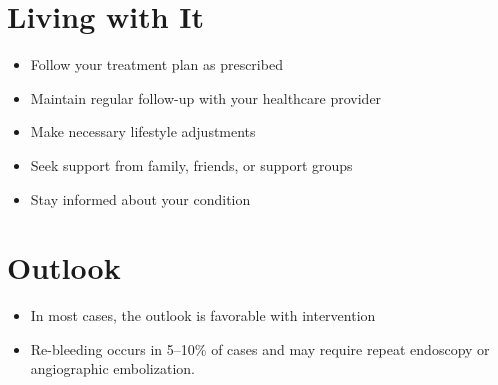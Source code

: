 \section{Living with It}
\begin{itemize}[noitemsep]
  \item Follow your treatment plan as prescribed
  \item Maintain regular follow-up with your healthcare provider
  \item Make necessary lifestyle adjustments
  \item Seek support from family, friends, or support groups
  \item Stay informed about your condition
\end{itemize}
\section{Outlook}
\begin{itemize}[noitemsep]
  \item In most cases, the outlook is favorable with intervention
  \item Re-bleeding occurs in 5--10\% of cases and may require repeat endoscopy or angiographic embolization.
\end{itemize}
